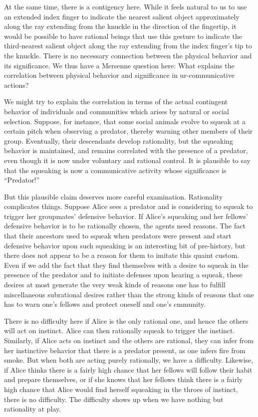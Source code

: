 At the same time, there is a contigency here. While it feels natural to us to use an extended index
finger to indicate the nearest salient object approximately along the ray extending from the knuckle in the direction of
the fingertip, it would be possible to have rational beings that use this gesture to indicate the third-nearest salient
object along the ray extending from the index finger's tip to the knuckle. There is no necessary connection between the
physical behavior and its significance. We thus have a Mersenne question here: What explains the correlation between
physical behavior and significance in ur-communicative actions?

We might try to explain the correlation in terms of the actual contingent behavior of individuals and communities
which arises by natural or social selection. Suppose, for instance, that some social animals evolve to squeak at 
a certain pitch when observing a predator, thereby warning other members of their group. Eventually, their descendants
develop rationality, but the squeaking behavior is maintained, and remains correlated with the presence of a predator, even 
though it is now under voluntary and rational control. It is plausible to say that the squeaking is now a communicative
activity whose significance is ``Predator!'' 

But this plausible claim deserves more careful examination. Rationality complicates things. Suppose Alice sees a 
predator and is considering to squeak to trigger her groupmates' defensive behavior. If Alice's squeaking and her fellows' 
defensive behavior is to be rationally chosen, the agents need reasons. The fact that their ancestors used to squeak 
when predators were present and start defensive behavior upon such squeaking is an interesting bit of pre-history,
but there does not appear to be a reason for them to imitate this quaint custom. Even if we add the fact that they
find themselves with a desire to squeak in the presence of the predator and to initiate defenses upon hearing a squeak,
these desires at most generate the very weak kinds of reasons one has to fulfill miscellaneous subrational desires rather 
than the strong kinds of reasons that one has to warn one's fellows and protect oneself and one's cmmunity. 

There is no difficulty here if Alice is the only rational one, and hence the others will act on instinct. Alice can
then rationally squeak to trigger the instinct. Similarly, if Alice acts on instinct and the others are rational, they
can infer from her instinctive behavior that there is a predator present, as one infers fire from smoke. But when both
are acting purely rationally, we have a difficulty. Likewise, if Alice thinks there is a fairly high chance that her
fellows will follow their habit and prepare themselves, or if she knows that her fellows think there is a fairly high 
chance that Alice would find herself squeaking in the throes of instinct, there is no difficulty. The difficulty shows
up when we have nothing but rationality at play.

